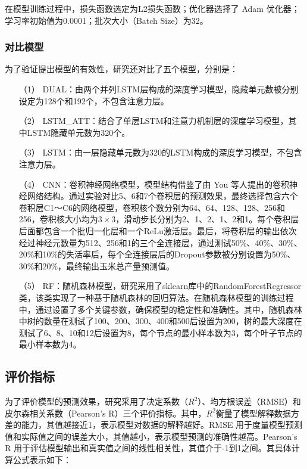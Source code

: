 \par 在模型训练过程中，损失函数选定为L2损失函数；优化器选择了 Adam 优化器；学习率初始值为0.0001；批次大小（Batch Size）为32。

\subsubsection{对比模型}

\par 为了验证提出模型的有效性，研究还对比了五个模型，分别是：

\begin{itemize}
  \item [（1）] DUAL：由两个并列LSTM层构成的深度学习模型，隐藏单元数被分别设定为128个和192个，不包含注意力层。
  \item [（2）] LSTM\_ATT：结合了单层LSTM和注意力机制层的深度学习模型，其中LSTM隐藏单元数为320个。
  \item [（3）] LSTM：由一层隐藏单元数为320的LSTM构成的深度学习模型，不包含注意力层。
  \item [（4）] CNN：卷积神经网络模型，模型结构借鉴了由 You 等人\cite{you2017deep}提出的卷积神经网络结构。通过实验对比5、6和7个卷积层的预测效果，最终选择包含六个卷积层C1～C6的网络模型，卷积核个数分别为64、64、128、128、256和256，卷积核大小均为$3\times 3$，滑动步长分别为2、1、2、1、2和1。每个卷积层后面都包含一个批归一化层和一个ReLu激活层。最后，将卷积层的输出依次经过神经元数量为512、256和1的三个全连接层，通过测试50\%、40\%、30\%、20\%和10\%的失活率后，每个全连接层后的Dropout参数被分别设置为50\%、30\%和20\%，最终输出玉米总产量预测值。
  \item [（5）] RF：随机森林模型，研究采用了sklearn库中的RandomForestRegressor类，该类实现了一种基于随机森林的回归算法。在随机森林模型的训练过程中，通过设置了多个关键参数，确保模型的稳定性和准确性。其中，随机森林中树的数量在测试了100、200、300、400和500后设置为200，树的最大深度在测试了6、8、10和12后设置为8，每个节点的最小样本数为3，每个叶子节点的最小样本数为4。
\end{itemize}
\subsection{评价指标}

\par 为了评价模型的预测效果，研究采用了决定系数（$R^2$）、均方根误差（RMSE）和皮尔森相关系数（Pearson's R）三个评价指标。其中，$R^2$衡量了模型解释数据方差的能力，其值越接近1，表示模型对数据的解释越好。RMSE 用于度量模型预测值和实际值之间的误差大小，其值越小，表示模型预测的准确性越高。Pearson's R 用于评估模型输出和真实值之间的线性相关性，其值介于-1到1之间。其具体计算公式表示如下：

